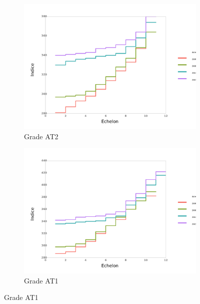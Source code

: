 \documentclass[11pt,a4paper]{article}
\begin{document}
\medskip


\begin{figure}[ht] 
  \caption{Evolution des grilles: grade par grade}
  \label{echelon_by_neg} 
  \begin{subfigure}[b]{0.55\linewidth}
      \caption{Grade AT2} 
    \label{echelon_by_neg_0} 
    \centering
    \includegraphics[width=1\linewidth]{0_grille_by_neg.pdf} 
    \vspace{4ex}
  \end{subfigure}%
  \begin{subfigure}[b]{0.55\linewidth}
        \caption{Grade AT1} 
    \label{echelon_by_neg_1} 
    \centering
    \includegraphics[width=1\linewidth]{1_grille_by_neg.pdf} 
    \vspace{4ex}

\end{subfigure}
\end{figure}
\end{document}
